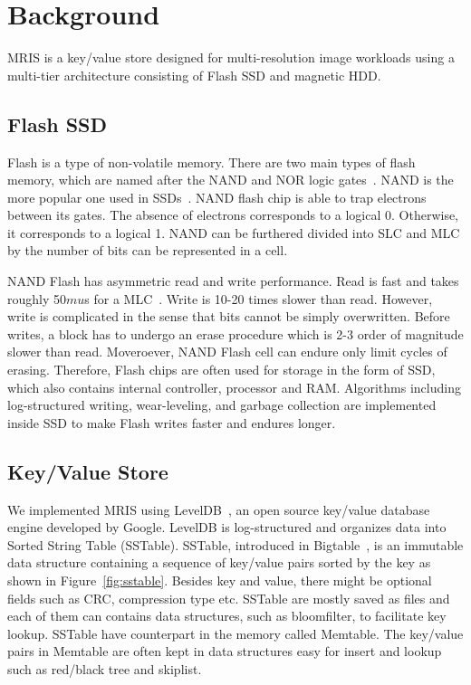 \section{Background}
\label{sec:bg}

MRIS is a key/value store designed for multi-resolution image
workloads using a multi-tier architecture consisting of Flash SSD and
magnetic HDD.

\subsection{Flash SSD}
Flash is a type of non-volatile memory. There are two main types of
flash memory, which are named after the NAND and NOR logic
gates~\cite{flashwiki}. NAND is the more popular one used in
SSDs~\cite{ssdanatomy}.  NAND flash chip is able to trap electrons
between its gates. The absence of electrons corresponds to a logical
0. Otherwise, it corresponds to a logical 1. NAND can be furthered
divided into SLC and MLC by the number of bits can be represented in a
cell.

NAND Flash has asymmetric read and write performance. Read is fast and
takes roughly 50$mu$s for a MLC~\cite{ssdanatomy}. Write is 10-20
times slower than read. However, write is complicated in the sense
that bits cannot be simply overwritten. Before writes, a block has to
undergo an erase procedure which is 2-3 order of magnitude slower than
read. Moveroever, NAND Flash cell can endure only limit cycles of
erasing. Therefore, Flash chips are often used for storage in the form
of SSD, which also contains internal controller, processor and RAM.
Algorithms including log-structured writing, wear-leveling, and
garbage collection are implemented inside SSD to make Flash writes
faster and endures longer.

\subsection{Key/Value Store}
We implemented MRIS using LevelDB~\cite{leveldb-web}, an open source
key/value database engine developed by Google.  LevelDB is
log-structured and organizes data into Sorted String Table (SSTable).
SSTable, introduced in Bigtable~\cite{chang06osdi}, is an immutable
data structure containing a sequence of key/value pairs sorted by the
key as shown in Figure~\ref{fig:sstable}. Besides key and value, there
might be optional fields such as CRC, compression type etc. SSTable
are mostly saved as files and each of them can contains data
structures, such as bloomfilter, to facilitate key lookup. SSTable
have counterpart in the memory called Memtable. The key/value pairs in
Memtable are often kept in data structures easy for insert and lookup
such as red/black tree and skiplist.

